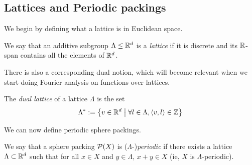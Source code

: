 \subsection{Lattices and Periodic packings}

We begin by defining what a lattice is in Euclidean space.

\begin{definition}\label{IsZLattice}\leanok
  We say that an additive subgroup $\Lambda \leq \mathbb{R}^d$ is a \emph{lattice} if it is discrete and its $\mathbb{R}$-span contains all the elements of $\mathbb{R}^d$.
\end{definition}

There is also a corresponding dual notion, which will become relevant when we start doing Fourier analysis on functions over lattices.

\begin{definition}\label{def:dual-lattice}\leanok
  The \emph{dual lattice} of a lattice $\Lambda$ is the set
  \[ \Lambda^* := \left\{ v \in \mathbb{R}^d \; \middle| \; \forall l \in \Lambda, \left\langle v,l \right\rangle \in \mathbb{Z} \right\} \]
\end{definition}



We can now define periodic sphere packings.

\begin{definition}\label{PeriodicSpherePacking}\leanok
  We say that a sphere packing $\mathcal{P}(X)$ is ($\Lambda$-)\emph{periodic} if there exists a lattice $\Lambda \subset \mathbb{R}^d$ such that for all $x \in X$ and $y \in \Lambda$, $x + y \in X$ (ie, $X$ is $\Lambda$-periodic).
\end{definition}

